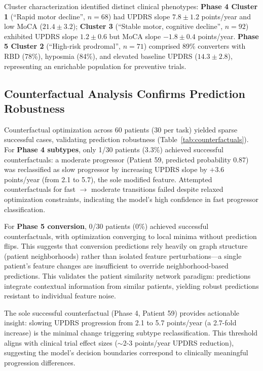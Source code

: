 Cluster characterization identified distinct clinical phenotypes: \textbf{Phase 4 Cluster 1} (``Rapid motor decline'', $n=68$) had UPDRS slope $7.8 \pm 1.2$ points/year and low MoCA ($21.4 \pm 3.2$); \textbf{Cluster 3} (``Stable motor, cognitive decline'', $n=92$) exhibited UPDRS slope $1.2 \pm 0.6$ but MoCA slope $-1.8 \pm 0.4$ points/year. \textbf{Phase 5 Cluster 2} (``High-risk prodromal'', $n=71$) comprised 89\% converters with RBD (78\%), hyposmia (84\%), and elevated baseline UPDRS ($14.3 \pm 2.8$), representing an enrichable population for preventive trials.

\subsection{Counterfactual Analysis Confirms Prediction Robustness}

Counterfactual optimization across 60 patients (30 per task) yielded sparse successful cases, validating prediction robustness (Table~\ref{tab:counterfactuals}). For \textbf{Phase 4 subtypes}, only 1/30 patients (3.3\%) achieved successful counterfactuals: a moderate progressor (Patient 59, predicted probability 0.87) was reclassified as slow progressor by increasing UPDRS slope by $+3.6$ points/year (from 2.1 to 5.7), the sole modified feature. Attempted counterfactuals for fast $\to$ moderate transitions failed despite relaxed optimization constraints, indicating the model's high confidence in fast progressor classification.

For \textbf{Phase 5 conversion}, 0/30 patients (0\%) achieved successful counterfactuals, with optimization converging to local minima without prediction flips. This suggests that conversion predictions rely heavily on graph structure (patient neighborhoods) rather than isolated feature perturbations—a single patient's feature changes are insufficient to override neighborhood-based predictions. This validates the patient similarity network paradigm: predictions integrate contextual information from similar patients, yielding robust predictions resistant to individual feature noise.

The sole successful counterfactual (Phase 4, Patient 59) provides actionable insight: slowing UPDRS progression from 2.1 to 5.7 points/year (a 2.7-fold increase) is the minimal change triggering subtype reclassification. This threshold aligns with clinical trial effect sizes ($\sim$2-3 points/year UPDRS reduction)\cite{olanow2009effect}, suggesting the model's decision boundaries correspond to clinically meaningful progression differences.

